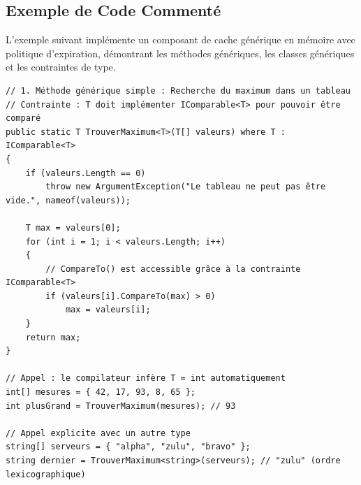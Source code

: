 \subsection{Exemple de Code Commenté}

L'exemple suivant implémente un composant de cache générique en mémoire avec politique d'expiration, démontrant les méthodes génériques, les classes génériques et les contraintes de type.

\begin{lstlisting}[caption={Méthode générique et classe générique avec contraintes}]
// 1. Méthode générique simple : Recherche du maximum dans un tableau
// Contrainte : T doit implémenter IComparable<T> pour pouvoir être comparé
public static T TrouverMaximum<T>(T[] valeurs) where T : IComparable<T>
{
    if (valeurs.Length == 0)
        throw new ArgumentException("Le tableau ne peut pas être vide.", nameof(valeurs));

    T max = valeurs[0];
    for (int i = 1; i < valeurs.Length; i++)
    {
        // CompareTo() est accessible grâce à la contrainte IComparable<T>
        if (valeurs[i].CompareTo(max) > 0)
            max = valeurs[i];
    }
    return max;
}

// Appel : le compilateur infère T = int automatiquement
int[] mesures = { 42, 17, 93, 8, 65 };
int plusGrand = TrouverMaximum(mesures); // 93

// Appel explicite avec un autre type
string[] serveurs = { "alpha", "zulu", "bravo" };
string dernier = TrouverMaximum<string>(serveurs); // "zulu" (ordre lexicographique)
\end{lstlisting}

